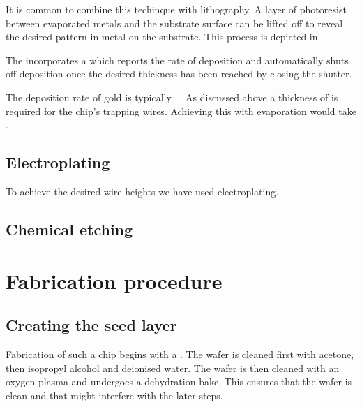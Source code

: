 {It is common to combine this techinque with lithography. A layer of photoresist
between evaporated metals and the substrate surface can be lifted off to reveal
the desired pattern in metal on the substrate.  This process is
depicted in 

\begin{figure}
  \caption{}
  \label{fab:fig:photolith}
\end{figure}


The  incorporates a  which reports the rate of
deposition and automatically shuts off deposition once the desired thickness
has been reached by closing the shutter. 

The deposition rate of gold is typically .~\cite{} As discussed above 
a thickness of  is required for the chip's trapping wires. Achieving
this with evaporation would take . 

\subsection{Electroplating}

To achieve the desired wire heights we have used electroplating. 

\subsection{Chemical etching}

\section{Fabrication procedure}


\subsection{Creating the seed layer}

Fabrication of such a chip begins with a . The wafer
is cleaned first with acetone, then isopropyl alcohol and deionised water. The
wafer is then cleaned with an oxygen plasma and undergoes a dehydration bake.
This ensures that the wafer is clean and  that
might interfere with the later steps.

}
